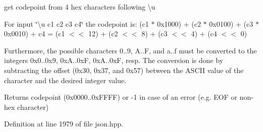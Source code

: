 get codepoint from 4 hex characters following {\ttfamily \textbackslash{}u} 

For input \char`\"{}\textbackslash{}u c1 c2 c3 c4\char`\"{} the codepoint is\+: (c1 $\ast$ 0x1000) + (c2 $\ast$ 0x0100) + (c3 $\ast$ 0x0010) + c4 = (c1 $<$$<$ 12) + (c2 $<$$<$ 8) + (c3 $<$$<$ 4) + (c4 $<$$<$ 0)

Furthermore, the possible characters \textquotesingle{}0\textquotesingle{}..\textquotesingle{}9\textquotesingle{}, \textquotesingle{}A\textquotesingle{}..\textquotesingle{}F\textquotesingle{}, and \textquotesingle{}a\textquotesingle{}..\textquotesingle{}f\textquotesingle{} must be converted to the integers 0x0..0x9, 0xA..0xF, 0xA..0xF, resp. The conversion is done by subtracting the offset (0x30, 0x37, and 0x57) between the A\+S\+C\+II value of the character and the desired integer value.

\begin{DoxyReturn}{Returns}
codepoint (0x0000..0x\+F\+F\+FF) or -\/1 in case of an error (e.\+g. E\+OF or non-\/hex character) 
\end{DoxyReturn}


Definition at line 1979 of file json.\+hpp.


